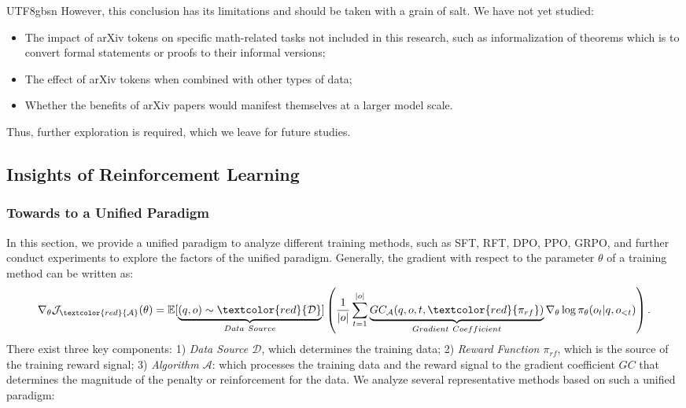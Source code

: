 \documentclass[11pt, a4paper, logo, copyright, nonumbering]{deepseek}
\begin{document}
\begin{CJK*}{UTF8}{gbsn}
However, this conclusion has its limitations and should be taken with a grain of salt.
We have not yet studied:
\begin{itemize}[topsep=0pt]
    \item The impact of arXiv tokens on specific math-related tasks not included in this research, such as informalization of theorems which is to convert formal statements or proofs to their informal versions;
    \item The effect of arXiv tokens when combined with other types of data;
    \item Whether the benefits of arXiv papers would manifest themselves at a larger model scale.
\end{itemize}
Thus, further exploration is required, which we leave for future studies.

\subsection{Insights of Reinforcement Learning}
\subsubsection{Towards to a Unified Paradigm}
In this section, we provide a unified paradigm to analyze different training methods, such as SFT, RFT, DPO, PPO, GRPO, and further conduct experiments to explore the factors of the unified paradigm. 
Generally, the gradient with respect to the parameter $\theta$ of a training method can be written as:
\begin{equation}
    \nabla_{\theta}\mathcal{J}_{\textcolor{red}{\mathcal{A}}}(\theta) = \mathbb{E}[\underbrace{(q,o) \sim \textcolor{red}{\mathcal{D}}}_{Data \ Source}]\left( \frac{1}{|o|} \sum_{t=1}^{|o|}  \underbrace{GC_{{\mathcal{A}}}(q, o, t, \textcolor{red}{\pi_{{rf}}})}_{Gradient \ Coefficient}  \nabla_{\theta}\log \pi_{\theta}(o_t | q, o_{<t})\right).
\label{eq:objective}
\end{equation}
There exist three key components: 
1) \textit{Data Source $\mathcal{D}$}, which determines the training data;
2) \textit{Reward Function $\pi_{{rf}}$}, which is the source of the training reward signal;
3) \textit{Algorithm $\mathcal{A}$}: which processes the training data and the reward signal to the gradient coefficient $GC$ that determines the magnitude of the penalty or reinforcement for the data. We analyze several representative methods based on such a unified paradigm:



\end{CJK*}
\end{document}
